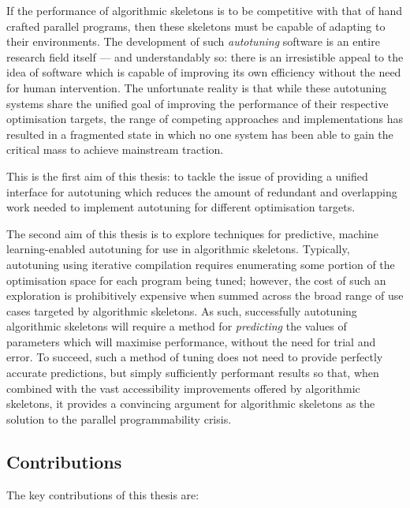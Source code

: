 \documentclass[nonatbib,preprint,9pt]{sigplanconf}
\begin{document}

If the performance of algorithmic skeletons is to be competitive with
that of hand crafted parallel programs, then these skeletons must be
capable of adapting to their environments. The development of such
\emph{autotuning} software is an entire research field itself --- and
understandably so: there is an irresistible appeal to the idea of
software which is capable of improving its own efficiency without the
need for human intervention. The unfortunate reality is that while
these autotuning systems share the unified goal of improving the
performance of their respective optimisation targets, the range of
competing approaches and implementations has resulted in a fragmented
state in which no one system has been able to gain the critical mass
to achieve mainstream traction.

This is the first aim of this thesis: to tackle the issue of providing
a unified interface for autotuning which reduces the amount of
redundant and overlapping work needed to implement autotuning for
different optimisation targets.


The second aim of this thesis is to explore techniques for predictive,
machine learning-enabled autotuning for use in algorithmic
skeletons. Typically, autotuning using iterative compilation requires
enumerating some portion of the optimisation space for each program
being tuned; however, the cost of such an exploration is prohibitively
expensive when summed across the broad range of use cases targeted by
algorithmic skeletons. As such, successfully autotuning algorithmic
skeletons will require a method for \emph{predicting} the values of
parameters which will maximise performance, without the need for trial
and error. To succeed, such a method of tuning does not need to
provide perfectly accurate predictions, but simply sufficiently
performant results so that, when combined with the vast accessibility
improvements offered by algorithmic skeletons, it provides a
convincing argument for algorithmic skeletons as the solution to the
parallel programmability crisis.


\subsection{Contributions}

The key contributions of this thesis are:
\end{document}
